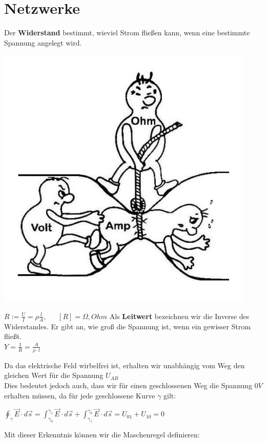					\section{Netzwerke}
					\label{chap:Style}



					\beginip
					Der \textbf{Widerstand} bestimmt, wieviel Strom fließen kann, wenn eine bestimmte Spannung angelegt wird. \\
					\begin{center}
						\includegraphics[scale=0.25]{img/widerstand.png}
					\end{center}
					\formulaBegin
					$ R :=  \frac{U}{I} =  \rho  \frac{l}{A}, \ \ \ \ \ \ \  {[R]} = \Omega, Ohm $
					\formulaEnd
					Als \textbf{Leitwert} bezeichnen wir die Inverse des Widerstandes. Er gibt an, wie groß die Spannung ist, wenn ein gewisser Strom fließt. \\
					\formulaBegin
					$ Y = \frac{1}{R} = \frac{A}{\rho \cdot l} $
					\formulaEnd
					\iend




										Da das elektrische Feld wirbelfrei ist, erhalten wir unabhängig vom Weg den gleichen Wert für die Spannung $ U_{AB} $ \\
										Dies bedeutet jedoch auch, dass wir für einen geschlossenen Weg die Spannung $0V$ erhalten müssen, da für jede geschlossene Kurve $\gamma$ gilt:
										\begin{center}
											\vspace{-2mm}

											$\displaystyle \oint_{\gamma} \vec{E} \cdot d\vec{s} = \int_{\gamma_0}^{\gamma_1} \vec{E} \cdot d\vec{s} + \int_{\gamma_1}^{\gamma_0} \vec{E} \cdot d\vec{s} = U_{01} + U_{10} = 0$
										\end{center}
										Mit dieser Erkenntnis können wir die Maschenregel definieren:

